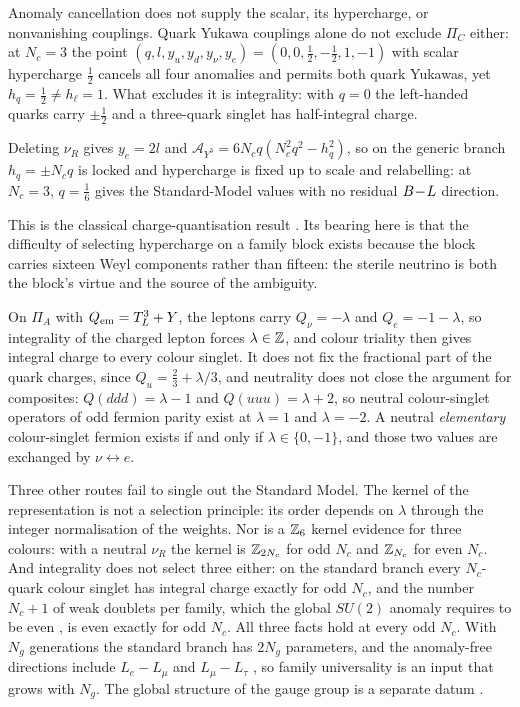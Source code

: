 Anomaly cancellation does not supply the scalar, its hypercharge, or nonvanishing couplings. Quark Yukawa couplings alone do not exclude
$\Pi_C$ either: at $N_c=3$ the point $(q,l,y_u,y_d,y_\nu,y_e)=(0,0,\tfrac12,-\tfrac12,1,-1)$ with scalar hypercharge $\tfrac12$ cancels all four
anomalies and permits both quark Yukawas, yet $h_q=\tfrac12\neq h_\ell=1$. What excludes it is integrality: with $q=0$ the left-handed quarks
carry $\pm\tfrac12$ and a three-quark singlet has half-integral charge.

\begin{theorem}
\label{thm:nonu}
Deleting $\nu_R$ gives $y_e=2l$ and $\mathcal A_{Y^3}=6N_cq(N_c^2q^2-h_q^2)$, so on the generic branch $h_q=\pm N_cq$ is locked and
hypercharge is fixed up to scale and relabelling: at $N_c=3$, $q=\tfrac16$ gives the Standard-Model values with no residual $B\!-\!L$ direction.
\end{theorem}

This is the classical charge-quantisation result \cite{FootLewVolkas,GengMarshak}. Its bearing here is that the difficulty of selecting
hypercharge on a family block exists because the block carries sixteen Weyl components rather than fifteen: the sterile neutrino is both
the block's virtue and the source of the ambiguity.

\begin{proposition}
\label{prop:integrality}
On $\Pi_A$ with $Q_{\rm em}=T^3_L+Y$, the leptons carry $Q_\nu=-\lambda$ and $Q_e=-1-\lambda$, so integrality of the charged lepton forces
$\lambda\in\mathbb{Z}$, and colour triality then gives integral charge to every colour singlet. It does not fix the fractional part of the quark
charges, since $Q_u=\tfrac23+\lambda/3$, and neutrality does not close the argument for composites: $Q(ddd)=\lambda-1$ and $Q(uuu)=\lambda+2$, so
neutral colour-singlet operators of odd fermion parity exist at $\lambda=1$ and $\lambda=-2$. A neutral \emph{elementary} colour-singlet
fermion exists if and only if $\lambda\in\{0,-1\}$, and those two values are exchanged by $\nu\leftrightarrow e$.
\end{proposition}

Three other routes fail to single out the Standard Model. The kernel of the representation is not a selection principle: its order
depends on $\lambda$ through the integer normalisation of the weights. Nor is a $\mathbb{Z}_6$ kernel evidence for three colours: with a neutral
$\nu_R$ the kernel is $\mathbb{Z}_{2N_c}$ for odd $N_c$ and $\mathbb{Z}_{N_c}$ for even $N_c$. And integrality does not select three either: on the standard
branch every $N_c$-quark colour singlet has integral charge exactly for odd $N_c$, and the number $N_c+1$ of weak doublets per family, which
the global $SU(2)$ anomaly requires to be even \cite{Witten82}, is even exactly for odd $N_c$. All three facts hold at every odd $N_c$. With
$N_g$ generations the standard branch has $2N_g$ parameters, and the anomaly-free directions include $L_e-L_\mu$ and $L_\mu-L_\tau$
\cite{HeJoshiLewVolkas}, so family universality is an input that grows with $N_g$. The global structure of the gauge group is a separate
datum \cite{Tong,GaiottoKapustinSeibergWillett}.

